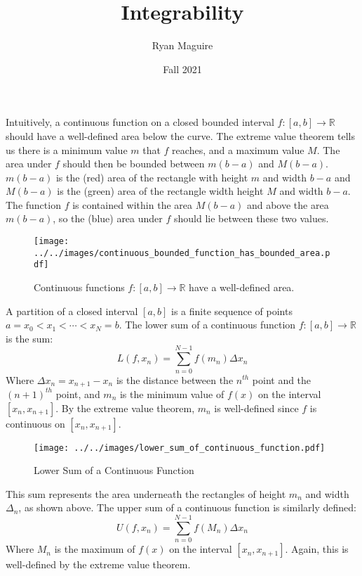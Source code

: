 \documentclass{article}
\title{Integrability}
\author{Ryan Maguire}
\date{Fall 2021}
\theoremstyle{normal}
\theoremstyle{plain}
\begin{document}
    \maketitle
    Intuitively, a continuous function on a closed bounded interval
    $f:[a,b]\rightarrow\mathbb{R}$ should have a well-defined area below
    the curve. The extreme value theorem tells us there is a minimum value
    $m$ that $f$ reaches, and a maximum value $M$. The area under $f$ should
    then be bounded between $m(b-a)$ and $M(b-a)$. $m(b-a)$ is the (red) area
    of the rectangle with height $m$ and width $b-a$ and $M(b-a)$ is the
    (green) area of the rectangle width height $M$ and width $b-a$. The
    function $f$ is contained within the area $M(b-a)$ and above the area
    $m(b-a)$, so the (blue) area under $f$ should lie between these two values.
    \begin{figure}[H]
        \centering
        \texttt{[image: ../../images/continuous\_bounded\_function\_has\_bounded\_area.pdf]}
        \caption{Continuous functions $f:[a,b]\rightarrow\mathbb{R}$ have a
                 well-defined area.}
    \end{figure}
    A partition of a closed interval $[a,b]$ is a finite sequence of points
    $a=x_{0}<x_{1}<\cdots<x_{N}=b$. The lower sum of a continuous function
    $f:[a,b]\rightarrow\mathbb{R}$ is the sum:
    \begin{equation}
        L(f,x_{n})=\sum_{n=0}^{N-1}f(m_{n})\Delta{x}_{n}
    \end{equation}
    Where $\Delta{x}_{n}=x_{n+1}-x_{n}$ is the distance between the
    $n^{th}$ point and the $(n+1)^{th}$ point, and
    $m_{n}$ is the minimum value of $f(x)$ on the interval $[x_{n},x_{n+1}]$.
    By the extreme value theorem, $m_{n}$ is well-defined since $f$ is
    continuous on $[x_{n},x_{n+1}]$.
    \begin{figure}[H]
        \centering
        \texttt{[image: ../../images/lower\_sum\_of\_continuous\_function.pdf]}
        \caption{Lower Sum of a Continuous Function}
    \end{figure}
    This sum represents the area underneath the rectangles of height $m_{n}$
    and width $\Delta_{n}$, as shown above. The upper sum of a continuous
    function is similarly defined:
    \begin{equation}
        U(f,x_{n})=\sum_{n=0}^{N-1}f(M_{n})\Delta{x}_{n}
    \end{equation}
    Where $M_{n}$ is the maximum of $f(x)$ on the interval $[x_{n},x_{n+1}]$.
    Again, this is well-defined by the extreme value theorem.
\end{document}
